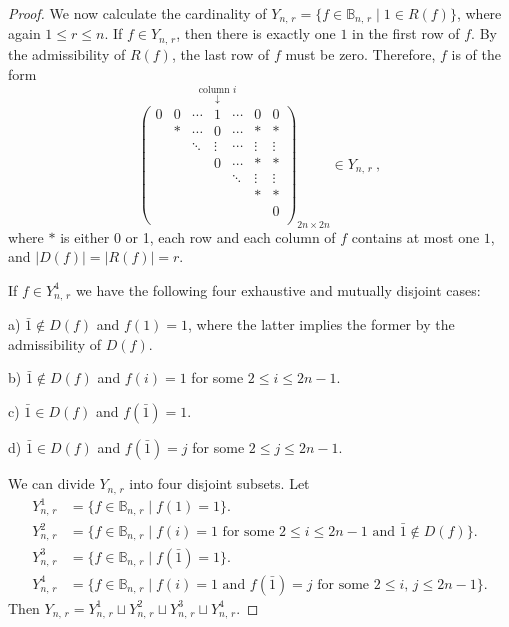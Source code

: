 \documentclass[11pt]{article}
\newcommand{\les}{\leqslant}
\begin{document}
\begin{proof}
We now calculate the cardinality of $Y_{n,\,r} = \{f\in \mathbb B_{n,\,r}\mid 1\in R(f)\}$, where again $1\les r\les n$.
%
If $f\in Y_{n,\,r}$, then there is exactly one $1$ in the first row of $f$. 
By the admissibility of $R(f)$, the last row of $f$ must be zero. 
Therefore, $f$ is of the form
\[
\overset{\text{column } i}{\overset{\downarrow}{
\begin{pmatrix}
            0 & 0 & \cdots & 1&\cdots & 0& 0 \\
              & * & \cdots & 0&\cdots & *& * \\
              &   & \ddots &\vdots&\cdots & \vdots& \vdots \\
              &   &        &0 & \cdots& *& * \\
              &   &        &  &\ddots &\vdots&\vdots \\
              &   &        &  &       & *& *  \\
              &   &        &  &       &  & 0  \\
             \end{pmatrix}}}_{2n \times 2n}\in Y_{n,\,r}~,
\]
where $*$ is either 0 or 1, each row and each column of $f$ contains at most one $1$, and $|D(f)|=|R(f)|=r$.  

If  $f\in Y^4_{n,\,r}$ we have the following four exhaustive and mutually disjoint cases:

a) $\bar{1}\notin D(f)$ and $f(1)=1$, where the latter implies the former by the admissibility of $D(f)$.

\vspace{-1mm}
b) $\bar{1}\notin D(f)$ and $f(i)=1$ for some $2\les i\les 2n-1$. 

\vspace{-1mm}
c) $\bar{1}\in D(f)$ and $f(\bar 1)=1$.

\vspace{-1mm}
d) $\bar{1}\in D(f)$ and $f(\bar 1)= j$ for some $2\les j\les 2n-1$. 

\noindent
We can divide $Y_{n,\,r}$ into four disjoint subsets. 
Let
\begin{align*}
    Y_{n,\,r}^1 &= \{f\in \mathbb B_{n,\,r}\mid f(1)=1\}.   \\
    Y_{n,\,r}^2 &= \{f\in \mathbb B_{n,\,r}\mid f(i)=1 \text{ for some } 2\les i\les 2n-1 \text{ and }\bar{1}\notin D(f) \}.   \\
    Y_{n,\,r}^3 &= \{f\in \mathbb B_{n,\,r}\mid f(\bar{1})=1\}.\\
    Y_{n,\,r}^4 &= \{f\in \mathbb B_{n,\,r}\mid f(i)=1 \text{ and } f(\bar{1})=j \text{ for some } 2\les i, \,j\les 2n-1\}.
\end{align*}
Then $Y_{n,\,r}= Y_{n,\,r}^1\sqcup Y_{n,\,r}^2\sqcup Y_{n,\,r}^3\sqcup Y_{n,\,r}^4$. 


\end{proof}
\end{document}
